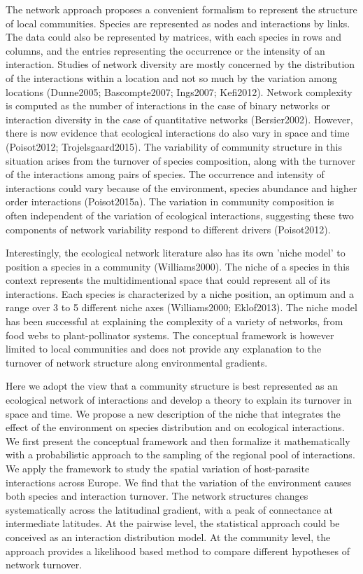 \documentclass[12pt]{article}
\begin{document}
The network approach proposes a convenient formalism to represent the
structure of local communities. Species are represented as nodes and
interactions by links. The data could also be represented by matrices, with
each species in rows and columns, and the entries representing the occurrence
or the intensity of an interaction. Studies of network diversity are mostly
concerned by the distribution of the interactions within a location and not so
much by the variation among locations (Dunne2005; Bascompte2007; Ings2007;
Kefi2012). Network complexity is computed as the number of interactions in the
case of binary networks or interaction diversity in the case of quantitative
networks (Bersier2002). However, there is now evidence that ecological
interactions do also vary in space and time (Poisot2012; Trojelsgaard2015).
The variability of community structure in this situation arises from the
turnover of species composition, along with the turnover of the interactions
among pairs of species. The occurrence and intensity of interactions could
vary because of the environment, species abundance and higher order
interactions (Poisot2015a). The variation in community composition is often
independent of the variation of ecological interactions, suggesting these two
components of network variability respond to different drivers (Poisot2012).

Interestingly, the ecological network literature also has its own 'niche model' to
position a species in a community (Williams2000). The niche of a species in
this context represents the multidimentional space that could represent all of
its interactions. Each species is characterized by a niche position, an
optimum and a range over 3 to 5 different niche axes (Williams2000;
Eklof2013). The niche model has been successful at explaining the complexity
of a variety of networks, from food webs to plant-pollinator systems. The
conceptual framework is however limited to local communities and does not
provide any explanation to the turnover of network structure along
environmental gradients.

Here we adopt the view that a community structure is best represented as an
ecological network of interactions and develop a theory to explain its
turnover in space and time. We propose a new description of the niche that
integrates the effect of the environment on species distribution and on
ecological interactions. We first present the conceptual framework and then
formalize it mathematically with a probabilistic approach to the sampling of
the regional pool of interactions. We apply the framework to study the spatial
variation of host-parasite interactions across Europe. We find that the
variation of the environment causes both species and interaction turnover. The
network structures changes systematically across the latitudinal gradient,
with a peak of connectance at intermediate latitudes. At the pairwise level,
the statistical approach could be conceived as an interaction distribution
model. At the community level, the approach provides a likelihood based
method to compare different hypotheses of network turnover. 
\end{document}
